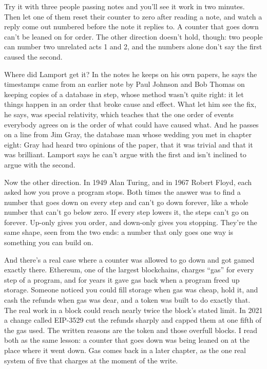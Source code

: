 \documentclass[11pt,twoside]{article}
\theoremstyle{thielethm}
\theoremstyle{thieledef}
\theoremstyle{thieledef}
\theoremstyle{thieledef}
\theoremstyle{thielethm}
\theoremstyle{thieleobs}
\theoremstyle{thielethm}
\begin{document}
Try it with three people passing notes and you'll see it work in two minutes. Then let one of them reset their counter to zero after reading a note, and watch a reply come out numbered before the note it replies to. A counter that goes down can't be leaned on for order. The other direction doesn't hold, though: two people can number two unrelated acts 1 and 2, and the numbers alone don't say the first caused the second.

Where did Lamport get it? In the notes he keeps on his own papers, he says the timestamps came from an earlier note by Paul Johnson and Bob Thomas on keeping copies of a database in step, whose method wasn't quite right: it let things happen in an order that broke cause and effect. What let him see the fix, he says, was special relativity, which teaches that the one order of events everybody agrees on is the order of what could have caused what. And he passes on a line from Jim Gray, the database man whose wedding you met in chapter eight: Gray had heard two opinions of the paper, that it was trivial and that it was brilliant. Lamport says he can't argue with the first and isn't inclined to argue with the second.

Now the other direction. In 1949 Alan Turing, and in 1967 Robert Floyd, each asked how you prove a program stops. Both times the answer was to find a number that goes down on every step and can't go down forever, like a whole number that can't go below zero. If every step lowers it, the steps can't go on forever. Up-only gives you order, and down-only gives you stopping. They're the same shape, seen from the two ends: a number that only goes one way is something you can build on.

And there's a real case where a counter was allowed to go down and got gamed exactly there. Ethereum, one of the largest blockchains, charges ``gas'' for every step of a program, and for years it gave gas back when a program freed up storage. Someone noticed you could fill storage when gas was cheap, hold it, and cash the refunds when gas was dear, and a token was built to do exactly that. The real work in a block could reach nearly twice the block's stated limit. In 2021 a change called EIP-3529 cut the refunds sharply and capped them at one fifth of the gas used. The written reasons are the token and those overfull blocks. I read both as the same lesson: a counter that goes down was being leaned on at the place where it went down. Gas comes back in a later chapter, as the one real system of five that charges at the moment of the write.
\end{document}
